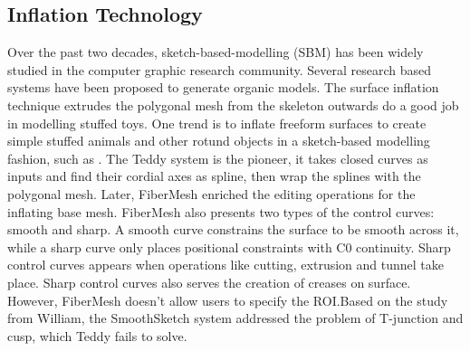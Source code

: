 \documentclass[10pt,twocolumn,letterpaper]{article}
\begin{document}
\subsection{Inflation Technology}
Over the past two decades, sketch-based-modelling (SBM) has been widely studied in the computer graphic research community. Several research based systems have been proposed to generate organic models. The surface inflation technique extrudes the polygonal mesh from the skeleton outwards do a good job in modelling stuffed toys. One trend is to inflate freeform surfaces to create simple stuffed animals and other rotund objects in a sketch-based modelling fashion, such as \cite{igarashi1999teddy, Karpenko:2006:SFS:1141911.1141928, nealen2007fibermesh}. The Teddy system \cite{igarashi1999teddy} is the pioneer, it takes closed curves as inputs and find their cordial axes as spline, then wrap the splines with the polygonal mesh. Later, FiberMesh\cite{nealen2007fibermesh} enriched the editing operations for the inflating base mesh. FiberMesh also presents two types of the control curves: smooth and sharp. A smooth curve constrains the surface to be smooth across it, while a sharp curve only places positional constraints with C0 continuity. Sharp control curves appears when operations like cutting, extrusion and tunnel take place. Sharp control curves also serves the creation of creases on surface. However, FiberMesh \cite{nealen2007fibermesh} doesn't allow users to specify the ROI.Based on the study from William\cite{williams1997stochastic}, the SmoothSketch system addressed the problem of T-junction and cusp, which Teddy fails to solve.\\
\end{document}
